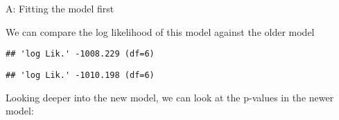 \documentclass[
]{article}
\newenvironment{Shaded}{\begin{snugshade}}{\end{snugshade}}
\newcommand{\CommentTok}[1]{\textcolor[rgb]{0.56,0.35,0.01}{\textit{#1}}}
\newcommand{\DecValTok}[1]{\textcolor[rgb]{0.00,0.00,0.81}{#1}}
\newcommand{\KeywordTok}[1]{\textcolor[rgb]{0.13,0.29,0.53}{\textbf{#1}}}
\newcommand{\NormalTok}[1]{#1}
\newcommand{\OperatorTok}[1]{\textcolor[rgb]{0.81,0.36,0.00}{\textbf{#1}}}
\newcommand{\StringTok}[1]{\textcolor[rgb]{0.31,0.60,0.02}{#1}}
\begin{document}

A: Fitting the model first

\begin{Shaded}
\end{Shaded}

We can compare the log likelihood of this model against the older model

\begin{Shaded}
\end{Shaded}

\begin{verbatim}
## 'log Lik.' -1008.229 (df=6)
\end{verbatim}

\begin{Shaded}
\end{Shaded}

\begin{verbatim}
## 'log Lik.' -1010.198 (df=6)
\end{verbatim}

Looking deeper into the new model, we can look at the p-values in the
newer model:

\begin{Shaded}
\end{Shaded}
\end{document}
